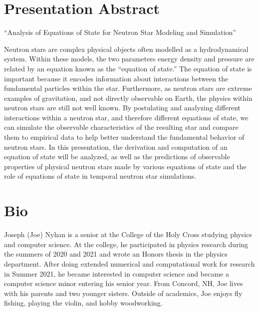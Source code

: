 \documentclass[12pt]{article}
\begin{document}
    \section*{Presentation Abstract}

    ``Analysis of Equations of State for Neutron Star Modeling and Simulation''
    \medskip

    \noindent Neutron stars are complex physical objects often modelled as a hydrodynamical system. Within these models, the two parameters energy density and pressure are related by an equation known as the ``equation of state.'' The equation of state is important because it encodes information about interactions between the fundamental particles within the star. Furthermore, as neutron stars are extreme examples of gravitation, and not directly observable on Earth, the physics within neutron stars are still not well known. By postulating and analyzing different interactions within a neutron star, and therefore different equations of state, we can simulate the observable characteristics of the resulting star and compare them to empirical data to help better understand the fundamental behavior of neutron stars. In this presentation, the derivation and computation of an equation of state will be analyzed, as well as the predictions of observable properties of physical neutron stars made by various equations of state and the role of equations of state in temporal neutron star simulations.

    \section*{Bio}

    Joseph (Joe) Nyhan is a senior at the College of the Holy Cross studying physics and computer science. At the college, he participated in physics research during the summers of 2020 and 2021 and wrote an Honors thesis in the physics department. After doing extended numerical and computational work for research in Summer 2021, he became interested in computer science and became a computer science minor entering his senior year. From Concord, NH, Joe lives with his parents and two younger sisters. Outside of academics, Joe enjoys fly fishing, playing the violin, and hobby woodworking.
\end{document}
